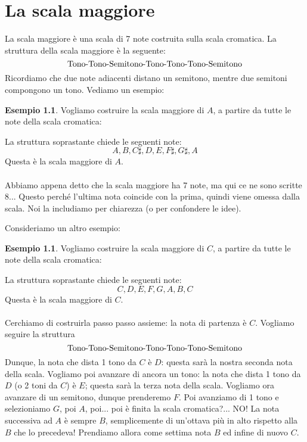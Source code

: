 \documentclass[12pt,a4paper]{book}
\theoremstyle{definition}
\theoremstyle{Theorem}
\theoremstyle{definition}
\newtheorem{Ex}[Def]{Esempio}
\theoremstyle{definition}
\theoremstyle{definition}
\begin{document}
	 \chapter{La scala maggiore}
	 La scala maggiore è una scala di 7 note costruita sulla scala cromatica. La struttura della scala maggiore è la seguente:
	 $$\hbox{Tono-Tono-Semitono-Tono-Tono-Tono-Semitono}$$ 
	 Ricordiamo che due note adiacenti distano un semitono, mentre due semitoni compongono un tono. Vediamo un esempio:
	 \begin{Ex}
	 	Vogliamo costruire la scala maggiore di $A$, a partire da tutte le note della scala cromatica:
	 	\begin{center}
	 	\end{center}
	 	La struttura soprastante chiede le seguenti note:
	 	$$A,B,C\sharp,D,E,F\sharp,G\sharp,A$$
	 	Questa è la scala maggiore di $A$.\\
	 	\\
	 	Abbiamo appena detto che la scala maggiore ha 7 note, ma qui ce ne sono scritte 8...
	 	Questo perché l'ultima nota coincide con la prima, quindi viene omessa dalla scala. Noi la includiamo per chiarezza (o per confondere le idee).\\
	 		 \end{Ex}
	 		 Consideriamo un altro esempio:
	 \begin{Ex}
	 	Vogliamo costruire la scala maggiore di $C$, a partire da tutte le note della scala cromatica:
	 		 	\begin{center}
	 		 \end{center}
	 		 La struttura soprastante chiede le seguenti note:
	 		 	$$C,D,E,F,G,A,B,C$$
	 		 Questa è la scala maggiore di $C$.\\
	 		 \\
	 		 Cerchiamo di costruirla passo passo assieme: la nota di partenza è $C$. Vogliamo seguire la struttura
	 		 $$\hbox{Tono-Tono-Semitono-Tono-Tono-Tono-Semitono}$$
	 		 Dunque, la nota che dista 1 tono da $C$ è $D$: questa sarà la nostra seconda nota della scala. Vogliamo poi avanzare di ancora un tono: la nota che dista 1 tono da $D$ (o 2 toni da $C$) è $E$; questa sarà la terza nota della scala. Vogliamo ora avanzare di un semitono, dunque prenderemo $F$. Poi avanziamo di 1 tono e selezioniamo $G$, poi $A$, poi... poi è finita la scala cromatica?... NO! La nota successiva ad $A$ è sempre $B$, semplicemente di un'ottava più in alto rispetto alla $B$ che lo precedeva! Prendiamo allora come settima nota $B$ ed infine di nuovo $C$. 
	 		 \end{Ex}
\end{document}
